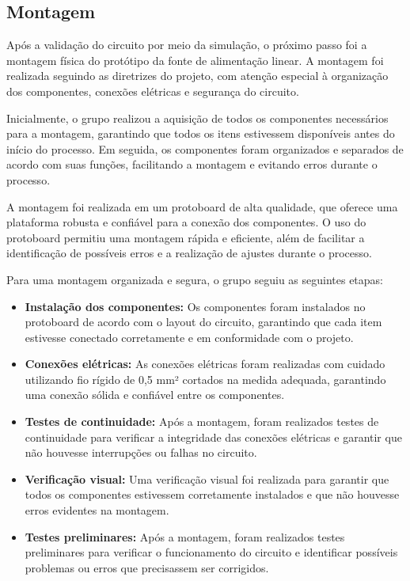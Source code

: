 \subsection{Montagem}

Após a validação do circuito por meio da simulação, o próximo passo foi a montagem física do protótipo da fonte de alimentação linear. A montagem foi realizada seguindo as diretrizes do projeto, com atenção especial à organização dos componentes, conexões elétricas e segurança do circuito. 

Inicialmente, o grupo realizou a aquisição de todos os componentes necessários para a montagem, garantindo que todos os itens estivessem disponíveis antes do início do processo. Em seguida, os componentes foram organizados e separados de acordo com suas funções, facilitando a montagem e evitando erros durante o processo. 

A montagem foi realizada em um protoboard de alta qualidade, que oferece uma plataforma robusta e confiável para a conexão dos componentes. O uso do protoboard permitiu uma montagem rápida e eficiente, além de facilitar a identificação de possíveis erros e a realização de ajustes durante o processo.

Para uma montagem organizada e segura, o grupo seguiu as seguintes etapas:

\begin{itemize}
    \item \textbf{Instalação dos componentes:} Os componentes foram instalados no protoboard de acordo com o layout do circuito, garantindo que cada item estivesse conectado corretamente e em conformidade com o projeto.
    \item \textbf{Conexões elétricas:} As conexões elétricas foram realizadas com cuidado utilizando fio rígido de 0,5 mm² cortados na medida adequada, garantindo uma conexão sólida e confiável entre os componentes.
    \item \textbf{Testes de continuidade:} Após a montagem, foram realizados testes de continuidade para verificar a integridade das conexões elétricas e garantir que não houvesse interrupções ou falhas no circuito.
    \item \textbf{Verificação visual:} Uma verificação visual foi realizada para garantir que todos os componentes estivessem corretamente instalados e que não houvesse erros evidentes na montagem.
    \item \textbf{Testes preliminares:} Após a montagem, foram realizados testes preliminares para verificar o funcionamento do circuito e identificar possíveis problemas ou erros que precisassem ser corrigidos.
\end{itemize}

